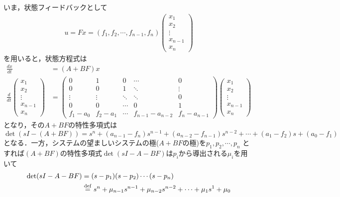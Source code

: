 いま，状態フィードバックとして
\begin{align}
 u = F x = 
 (f_1, f_2, \cdots, f_{n-1}, f_{n}) 
 \left(\begin{array}{c}
        x_1 \\
		x_2 \\
		\vdots \\
		x_{n-1} \\
		x_n
       \end{array}\right)
\end{align}
を用いると，状態方程式は
\begin{align}
 \frac{dx}{dt} &= (A+BF)x 
\nonumber \\
 \frac{d}{dt}
  \left(\begin{array}{c}
         x_1 \\
	 x_2 \\
	 \vdots \\
	 x_{n-1} \\
	 x_n
	\end{array}\right)
  &=
  \left(\begin{array}{ccccc}
     0      & 1      & 0      & \cdots & 0 \\
	 0      & 0      & 1      & \ddots & \vdots \\
	 \vdots & \vdots & \ddots & \ddots & 0 \\
	 0      & 0      & \cdots & 0      & 1 \\
	 f_1-a_0   & f_2 -a_1   & \cdots & f_{n-1} -a_{n-2} & f_{n} -a_{n-1}
	\end{array}\right)
  \left(\begin{array}{c}
	 x_1 \\
	 x_2 \\
	 \vdots \\
	 x_{n-1} \\
	 x_n
	\end{array}\right)
\end{align}
となり，その$A+BF$の特性多項式は
\begin{equation}
 \det (sI-{(A+BF)}) = s^n + (a_{n-1}-f_n) s^{n-1} 
  + (a_{n-2}-f_{n-1}) s^{n-2} + \cdots + (a_1-f_2) s + (a_0-f_1)
\label{eq:poleas_cha1}
\end{equation}
となる．一方，システムの望ましいシステムの極($A+BF$の極)を$p_1, p_2, \cdots, p_n$
とすれば$(A + B F)$の特性多項式$\det (s I - A - B F)$は$p_i$から導出される$\mu_i$を用いて
\begin{align}
 \mathop{\rm det}\nolimits (s I - A - B F)
 &= (s - p_1)(s - p_2) \cdots (s - p_n) \nonumber \\
 &\stackrel{\rm def}{=} s^n + \mu_{n-1} s^{n-1} + \mu_{n-2} s^{n-2}
  + \cdots + \mu_1 s^1 + \mu_0
\label{eq:poleas_cha2}
\end{align}
